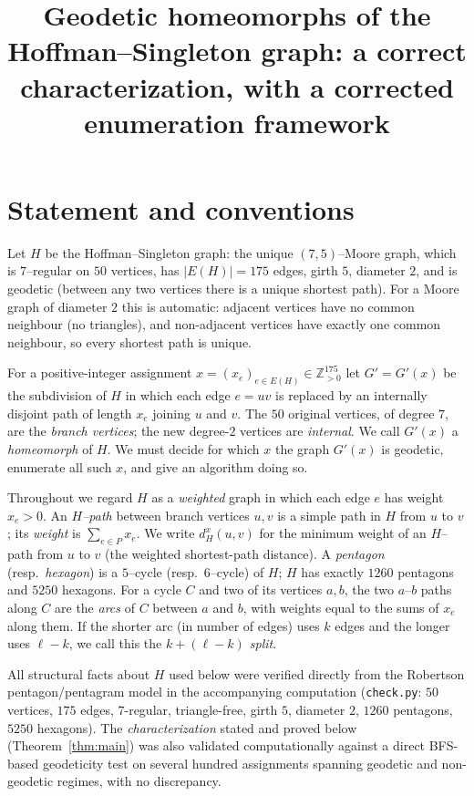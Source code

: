 \documentclass{amsart}
\theoremstyle{definition}
\begin{document}
\title{Geodetic homeomorphs of the Hoffman--Singleton graph: a correct
characterization, with a corrected enumeration framework}
\maketitle

\section{Statement and conventions}

Let $H$ be the Hoffman--Singleton graph: the unique $(7,5)$--Moore graph, which
is $7$--regular on $50$ vertices, has $|E(H)|=175$ edges, girth $5$, diameter
$2$, and is geodetic (between any two vertices there is a unique shortest path).
For a Moore graph of diameter $2$ this is automatic: adjacent vertices have no
common neighbour (no triangles), and non-adjacent vertices have exactly one
common neighbour, so every shortest path is unique.

For a positive-integer assignment $x=(x_e)_{e\in E(H)}\in\mathbb Z_{>0}^{175}$
let $G'=G'(x)$ be the subdivision of $H$ in which each edge $e=uv$ is replaced
by an internally disjoint path of length $x_e$ joining $u$ and $v$. The $50$
original vertices, of degree $7$, are the \emph{branch vertices}; the new
degree-$2$ vertices are \emph{internal}. We call $G'(x)$ a \emph{homeomorph} of
$H$. We must decide for which $x$ the graph $G'(x)$ is geodetic, enumerate all
such $x$, and give an algorithm doing so.

Throughout we regard $H$ as a \emph{weighted} graph in which each edge $e$ has
weight $x_e>0$. An \emph{$H$--path} between branch vertices $u,v$ is a simple
path in $H$ from $u$ to $v$; its \emph{weight} is $\sum_{e\in P}x_e$. We write
$d^x_H(u,v)$ for the minimum weight of an $H$--path from $u$ to $v$ (the weighted
shortest-path distance). A \emph{pentagon} (resp.\ \emph{hexagon}) is a $5$--cycle
(resp.\ $6$--cycle) of $H$; $H$ has exactly $1260$ pentagons and $5250$ hexagons.
For a cycle $C$ and two of its vertices $a,b$, the two $a$--$b$ paths along $C$
are the \emph{arcs} of $C$ between $a$ and $b$, with weights equal to the sums of
$x_e$ along them. If the shorter arc (in number of edges) uses $k$ edges and the
longer uses $\ell-k$, we call this the \emph{$k{+}(\ell-k)$ split}.

All structural facts about $H$ used below were verified directly from the
Robertson pentagon/pentagram model in the accompanying computation
(\texttt{check.py}: $50$ vertices, $175$ edges, $7$-regular, triangle-free,
girth $5$, diameter $2$, $1260$ pentagons, $5250$ hexagons). The
\emph{characterization} stated and proved below (Theorem~\ref{thm:main}) was also
validated computationally against a direct BFS-based geodeticity test on several
hundred assignments spanning geodetic and non-geodetic regimes, with no
discrepancy.
\end{document}
